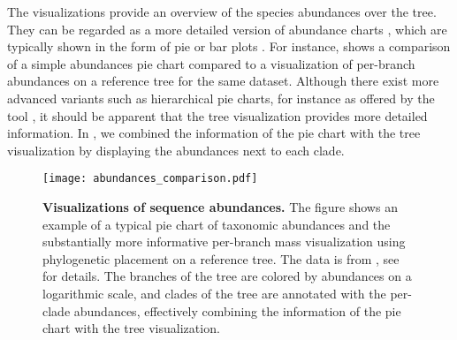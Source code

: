 The visualizations provide an overview of the species abundances over the tree.
They can be regarded as a more detailed version of abundance charts \cite{Huttenhower2012},
which are typically shown in the form of pie or bar plots \cite{Faust2015,Mahe2017,Lentendu2018}.
For instance,  shows a comparison of a simple abundances pie chart
compared to a visualization of per-branch abundances on a reference tree for the same dataset.
Although there exist more advanced variants such as
hierarchical pie charts, for instance as offered by the  tool \cite{Ondov2011},
it should be apparent that the tree visualization provides more detailed information.
In , we combined the information of the pie chart
with the tree visualization by displaying the abundances next to each clade.

\begin{figure}[!ht]
    \centering
    \texttt{[image: abundances\_comparison.pdf]}
    \begin{subfigure}{0pt}
        \label{fig:abundances_comparison:sub:pie_chart}
    \end{subfigure}
    \begin{subfigure}{0pt}
        \label{fig:abundances_comparison:sub:branch_colors}
    \end{subfigure}
    \caption[Visualizations of sequence abundances]{
        \textbf{Visualizations of sequence abundances.}
        The figure shows an example of
         a typical pie chart of taxonomic abundances and
         the substantially more informative
        per-branch mass visualization using phylogenetic placement on a reference tree.
        The data is from , see  for details.
        The branches of the tree are colored by abundances on a logarithmic scale,
        and clades of the tree are annotated with the per-clade abundances,
        effectively combining the information of the pie chart with the tree visualization.
    }
    \label{fig:abundances_comparison}
\end{figure}

